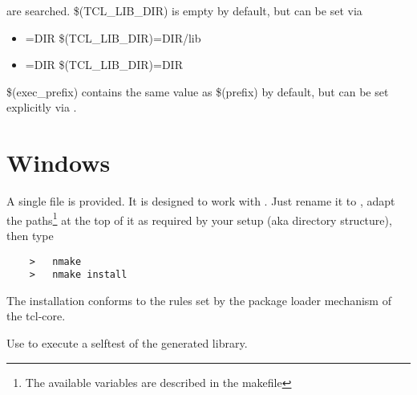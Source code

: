 \begin {itemize}
	are searched. \$(TCL\_LIB\_DIR) is empty by default, but
	can be set via

	\begin {itemize}
	\item[]	=DIR	      \ra {} \$(TCL\_LIB\_DIR)=DIR/lib
	\item[]	=DIR \ra {} \$(TCL\_LIB\_DIR)=DIR
	\end {itemize}

	\$(exec\_prefix) contains the same value as \$(prefix) by
	default, but can be set explicitly via .
\end {itemize}



\section {Windows}

A single file  is provided. It is designed to
work with . Just rename it to , adapt
the paths\footnote {The available variables are described in the
makefile} at the top of it as required by your setup (aka directory
structure), then type

\begin{verbatim}
	>	nmake
	>	nmake install
\end{verbatim}


The installation conforms to the rules set by the package loader
mechanism of the tcl-core.

Use  to execute a selftest of the generated library.



